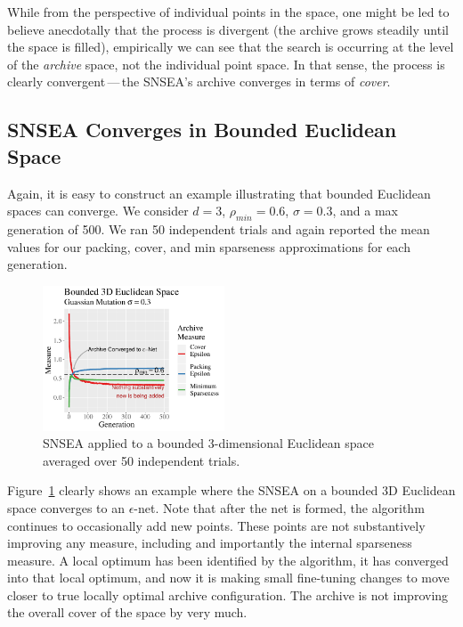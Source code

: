 \documentclass[twoside]{article}
\begin{document}
While from the perspective of individual points in the space, one might be led to believe anecdotally that the process is divergent (the archive grows steadily until the space is filled), empirically we can see that the search is occurring at the level of the \emph{archive} space, not the individual point space.  In that sense, the process is clearly convergent\,---\,the SNSEA's archive converges in terms of \emph{cover}.




\subsection{SNSEA Converges in Bounded Euclidean Space}
\label{subsec:bounded}
Again, it is easy to construct an example illustrating that bounded Euclidean spaces can converge.  We consider $d=3$, $\rho_{min} = 0.6$, $\sigma=0.3$, and a max generation of 500.  We ran 50 independent trials and again reported the mean values for our packing, cover, and min sparseness approximations for each generation.  
\begin{figure}[t]
\includegraphics[width=0.48\textwidth]{Figures/bounded-r-06-s-03.pdf}
\caption{\label{fig:bounded} SNSEA applied to a bounded 3-dimensional Euclidean space averaged over 50 independent trials.}
\end{figure}
%
Figure~\ref{fig:bounded} clearly shows an example where the SNSEA on a bounded 3D Euclidean space converges to an $\epsilon$-net.  Note that after the net is formed, the algorithm continues to occasionally add new points.  These points are not substantively improving any measure, including and importantly the internal sparseness measure.  A local optimum has been identified by the algorithm, it has converged into that local optimum, and now it is making small fine-tuning changes to move closer to true locally optimal archive configuration.  The archive is not improving the overall cover of the space by very much.
\end{document}
